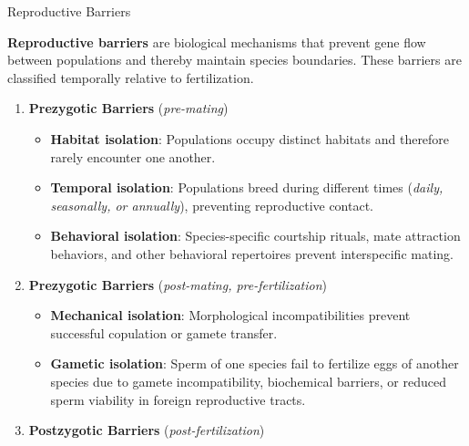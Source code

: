 \documentclass[10pt]{article}
\begin{document}
    \begin{core}{Reproductive Barriers}

      \textbf{Reproductive barriers} are biological mechanisms that prevent gene flow between populations and thereby maintain species boundaries. These barriers are classified temporally relative to fertilization.

      \begin{enumerate}

        \item \textbf{Prezygotic Barriers} (\textit{pre-mating})

        \begin{itemize}

          \item \textbf{Habitat isolation}: Populations occupy distinct habitats and therefore rarely encounter one another.

          \item \textbf{Temporal isolation}: Populations breed during different times (\textit{daily, seasonally, or annually}), preventing reproductive contact.

          \item \textbf{Behavioral isolation}: Species-specific courtship rituals, mate attraction behaviors, and other behavioral repertoires prevent interspecific mating.

        \end{itemize}

        \item \textbf{Prezygotic Barriers} (\textit{post-mating, pre-fertilization})

        \begin{itemize}

          \item \textbf{Mechanical isolation}: Morphological incompatibilities prevent successful copulation or gamete transfer.

          \item \textbf{Gametic isolation}: Sperm of one species fail to fertilize eggs of another species due to gamete incompatibility, biochemical barriers, or reduced sperm viability in foreign reproductive tracts.

        \end{itemize}

        \item \textbf{Postzygotic Barriers} (\textit{post-fertilization})

        \begin{itemize}


\end{itemize}
\end{enumerate}
\end{core}
\end{document}

